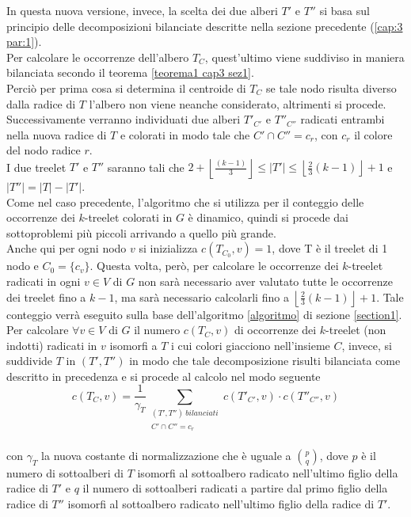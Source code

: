In questa nuova versione, invece, la scelta dei due alberi $ T' $ e $ T'' $ si basa sul principio delle decomposizioni bilanciate descritte nella sezione precedente (\ref{cap:3 par:1}).\\
Per calcolare le occorrenze dell'albero $ T_C $, quest'ultimo viene suddiviso in maniera bilanciata secondo il teorema \ref{teorema1 cap3 sez1}.\\
Perci\`o per prima cosa si determina il centroide di $ T_C $ se tale nodo risulta diverso dalla radice di $ T $ l'albero non viene neanche considerato, altrimenti si procede.\\
Successivamente verranno individuati due alberi $ T'_{C'} $ e $ T''_{C''} $ radicati entrambi nella nuova radice di $ T $ e colorati in modo tale che $ C' \cap C'' = c_r $, con $ c_r $ il colore del nodo radice $ r $.\\
I due treelet $ T' $ e $ T'' $ saranno tali che $2+ \left\lfloor \frac{(k-1)}{3}  \right\rfloor \le |T'| \le \left\lfloor \frac{2}{3}(k-1) \right\rfloor  +1 $ e $ |T''| = |T| -|T'| $.\\
Come nel caso precedente, l'algoritmo che si utilizza per il conteggio delle occorrenze dei $ k $-treelet colorati in $ G $ \`e dinamico, quindi si procede dai sottoproblemi pi\`u piccoli arrivando a quello pi\`u grande.\\
Anche qui per ogni nodo $ v $ si inizializza $ c(T_{C_0} , v) = 1 $, dove T \`e il treelet di 1 nodo e $ C_0 = \{c_v\} $.
Questa volta, per\`o, per calcolare le occorrenze dei $ k $-treelet radicati in ogni $ v \in V $ di $ G $ non sar\`a necessario aver valutato tutte le occorrenze dei treelet fino a $ k-1 $, ma sar\`a necessario calcolarli fino a $ \left\lfloor \frac{2}{3}(k-1)\right\rfloor +1 $.
Tale conteggio verr\`a eseguito sulla base dell'algoritmo \ref{algoritmo} di sezione \ref{section1}. \\
Per calcolare $ \forall v \in V  $ di $ G $ il numero $ c(T_C,v) $ di occorrenze dei $ k $-treelet (non indotti) radicati in $ v $ isomorfi a $ T $ i cui colori giacciono nell'insieme $ C $, invece, si suddivide $ T $ in $ (T',T'') $ in modo che tale decomposizione risulti bilanciata come descritto in precedenza e si procede al calcolo nel modo seguente\\
\[c(T_C,v) = \frac{1}{\gamma_T}\sum_{\substack{{(T',T'') \ bilanciati}\\{C' \cap C'' = c_r}}} c(T'_{C'},v)\cdot c(T''_{C''},v) \] \\
con $\gamma_T$ la nuova costante di normalizzazione che \`e uguale a $ \binom{p}{q} $, dove $ p  $ \`e il numero di sottoalberi di $ T $ isomorfi al sottoalbero radicato nell'ultimo figlio della radice di $ T' $ e $ q $ il numero di sottoalberi radicati a partire dal primo figlio della radice di $ T'' $ isomorfi al sottoalbero radicato nell'ultimo figlio della radice di $ T' $.
